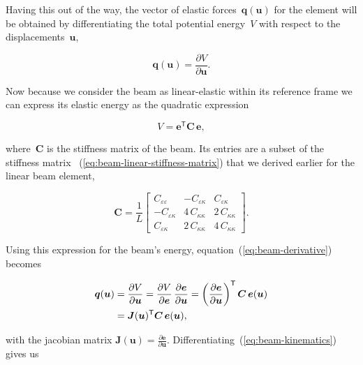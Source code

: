 Having this out of the way, the vector of elastic forces~$\boldsymbol{q}(\boldsymbol{u})$ for the element will be obtained by differentiating the total potential energy~$V$ with respect to the displacements~$\boldsymbol{u}$,

\begin{equation}
\boldsymbol{q}(\boldsymbol{u}) = \frac{\partial V}{\partial \boldsymbol{u}}.\label{eq:beam-derivative}
\end{equation}

Now because we consider the beam as linear-elastic within its reference frame we can express its elastic energy as the quadratic expression

\begin{equation}
V = \boldsymbol{e}^\mathsf{T} \boldsymbol{C}\,\boldsymbol{e},
\end{equation}

where~$\boldsymbol{C}$ is the stiffness matrix of the beam. Its entries are a subset of the stiffness matrix ~(\ref{eq:beam-linear-stiffness-matrix}) that we derived earlier for the linear beam element,

\begin{equation}
\boldsymbol{C} =
\frac{1}{L}
\begin{bmatrix}
C_{\varepsilon\varepsilon} & -C_{\varepsilon\kappa} & C_{\varepsilon\kappa}\\
-C_{\varepsilon\kappa} & 4\,C_{\kappa\kappa} & 2\,C_{\kappa\kappa}\\
C_{\varepsilon\kappa} & 2\,C_{\kappa\kappa} & 4\,C_{\kappa\kappa}
\end{bmatrix}.
\end{equation}

Using this expression for the beam's energy, equation~(\ref{eq:beam-derivative}) becomes

\begin{align}
\boldsymbol{q}(\boldsymbol{u}) &= \frac{\partial V}{\partial \boldsymbol{u}} =  \frac{\partial V}{\partial \boldsymbol{e}}\,\frac{\partial \boldsymbol{e}}{\partial \boldsymbol{u}} = \left(\frac{\partial \boldsymbol{e}}{\partial \boldsymbol{u}}\right)^\mathsf{T}\boldsymbol{C}\,\boldsymbol{e}(\boldsymbol{u})\notag\\
&= \boldsymbol{J}(\boldsymbol{u})^\mathsf{T}\boldsymbol{C}\,\boldsymbol{e}(\boldsymbol{u}),
\end{align}

with the jacobian matrix $\boldsymbol{J}(\boldsymbol{u}) = \frac{\partial \boldsymbol{e}}{\partial \boldsymbol{u}}$. Differentiating~(\ref{eq:beam-kinematics}) gives us

